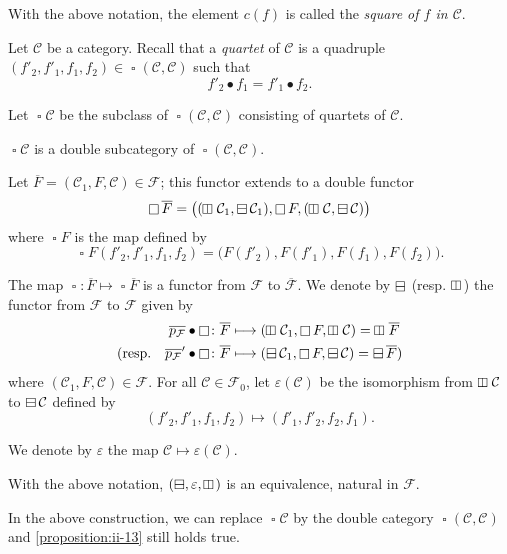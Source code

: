 \documentclass[a4paper,fleqn]{article}
\theoremstyle{plain}
\newenvironment{proposition}[1]
  {\renewcommand\theinnerproposition{#1}\innerproposition}
  {\endinnerproposition}
\theoremstyle{definition}
\newenvironment{definition}[1]
  {\renewcommand\theinnerdefinition{#1}\innerdefinition}
  {\endinnerdefinition}
\newcommand{\oldpage}[1]{{\marginpar{\footnotesize$\bigg\vert$\,\,\,\,\textit{p.~#1}}}}
\newcommand{\CC}{\mathcal{C}}
\newcommand{\FF}{\mathcal{F}}
\newcommand{\hsqbox}{{\boxminus}}
\newcommand{\vsqbox}{{\rotatebox{90}{$\boxminus$}}}
\DeclareMathOperator{\sq}{\square}
\DeclareMathOperator{\hsq}{\raisebox{-.05em}{$\hsqbox$}}
\DeclareMathOperator{\vsq}{\raisebox{-.1em}{$\vsqbox$\,}}
\begin{document}
\begin{definition}{14}
\label{definition:ii-14}
  With the above notation, the element $c(f)$ is called the \emph{square of $f$ in $\CC$}.
\end{definition}

Let $\CC$ be a category.
Recall \cite{3a} that a \emph{quartet} of $\CC$ is a quadruple $(f'_2,f'_1,f_1,f_2)\in\sq(\CC,\CC)$ such that
\[
  f'_2\bullet f_1
  = f'_1\bullet f_2.
\]

Let $\sq\CC$ be the subclass of $\sq(\CC,\CC)$ consisting of quartets of $\CC$.

\begin{proposition}{12}
\label{proposition:ii-12}
  $\sq\CC$ is a double subcategory of $\sq(\CC,\CC)$.
\end{proposition}

Let $\overline{F}=(\CC_1,F,\CC)\in\FF$;
this functor extends to a double functor
\[
  \sq\overline{F}
  = \big(
    (\vsq\CC_1,\hsq\CC_1), \sq F, (\vsq\CC,\hsq\CC)
  \big)
\]
where $\sq F$ is the map defined by
\[
  \sq F(f'_2,f'_1,f_1,f_2)
  = \big(
    F(f'_2), F(f'_1), F(f_1), F(f_2)
  \big).
\]

\oldpage{67}
The map $\sq\colon\overline{F}\mapsto\sq\overline{F}$ is a functor from $\FF$ to $\overline{\FF}$.
We denote by $\hsq$ (resp. $\vsq$) the functor from $\FF$ to $\FF$ given by
\[
  \begin{aligned}
    \overline{p_\FF}\bullet\sq
    &\colon \overline{F}
    \longmapsto (\vsq\CC_1,\sq F,\vsq\CC)
    = \vsq\overline{F}
  \\(\text{resp.}\quad \overline{p_\FF}'\bullet\sq
    &\colon \overline{F}
    \longmapsto (\hsq\CC_1,\sq F,\hsq\CC)
    = \hsq\overline{F})
  \end{aligned}
\]
where $(\CC_1,F,\CC)\in\FF$.
For all $\CC\in\FF_0$, let $\varepsilon(\CC)$ be the isomorphism from $\vsq\CC$ to $\hsq\CC$ defined by
\[
  (f'_2,f'_1,f_1,f_2)
  \longmapsto (f'_1,f'_2,f_2,f_1).
\]

We denote by $\varepsilon$ the map $\CC\mapsto\varepsilon(\CC)$.

\begin{proposition}{13}
\label{proposition:ii-13}
  With the above notation, $(\hsq,\varepsilon,\vsq)$ is an equivalence, natural in $\FF$.
\end{proposition}

In the above construction, we can replace $\sq\CC$ by the double category $\sq(\CC,\CC)$ and \cref{proposition:ii-13} still holds true.
\end{document}
